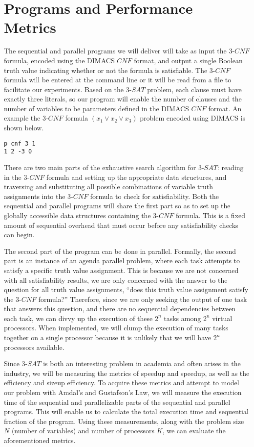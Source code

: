 \documentclass[paper=a4, fontsize=11pt]{scrartcl} %
\begin{document}
\section{Programs and Performance Metrics}
The sequential and parallel programs we will deliver will take as input 
the $3$-$CNF$ formula, encoded using the DIMACS $CNF$ format, 
and output a single Boolean truth value indicating whether or not the 
formula is satisfiable. The $3$-$CNF$ formula will be entered at the command 
line or it will be read from a file to facilitate our experiments. Based on 
the $3$-$SAT$ problem, each clause must have exactly three literals, so our 
program will enable the number of clauses and the number of variables 
to be parameters defined in the DIMACS $CNF$ format. An example the 
$3$-$CNF$ formula $(x_1 \lor x_2 \lor x_3)$ problem encoded using DIMACS is shown below.
\begin{center}
\begin{lstlisting}
p cnf 3 1
1 2 -3 0
\end{lstlisting}
\end{center}
There are two main parts of the exhaustive search algorithm for $3$-$SAT$: 
reading in the $3$-$CNF$ formula and setting up the appropriate data structures, 
and traversing and substituting all possible combinations of variable truth 
assignments into the $3$-$CNF$ formula to check for satisfiability. Both the 
sequential and parallel programs will share the first part so as to set up 
the globally accessible data structures containing the $3$-$CNF$ formula. 
This is a fixed amount of sequential overhead that must occur before any 
satisfiability checks can begin. 

The second part of the program can be done in parallel. Formally, the 
second part is an instance of an agenda parallel problem, where each 
task attempts to satisfy a specific truth value assignment. This is because 
we are not concerned with all satisfiability results, we are only concerned 
with the answer to the question for all truth value assignments, ``does this 
truth value assignment satisfy the $3$-$CNF$ formula?'' Therefore, since we 
are only seeking the output of one task that answers this question, and 
there are no sequential dependencies between each task, we can divvy 
up the execution of these $2^n$ tasks among $2^n$ virtual processors. When 
implemented, we will clump the execution of many tasks together on a single 
processor because it is unlikely that we will have $2^n$ processors available. 

Since $3$-$SAT$ is both an interesting problem in academia and often arises in 
the industry, we will be measuring the metrics of speedup and speedup, as 
well as the efficiency and sizeup efficiency. To acquire these metrics and 
attempt to model our problem with Amdal's and Gustafson's Law, we will 
measure the execution time of the sequential and parallelizable parts of 
the sequential and parallel programs. This will enable us to calculate the 
total execution time and sequential fraction of the program. Using these 
measurements, along with the problem size $N$ (number of variables) and 
number of processors $K$, we can evaluate the aforementioned metrics. 
\end{document}
